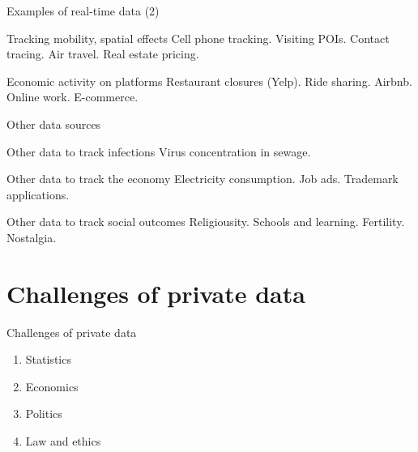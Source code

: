 \documentclass[
  ignorenonframetext,
  aspectratio=54,
]{beamer}
\providecommand{\tightlist}{%
  \setlength{\itemsep}{0pt}\setlength{\parskip}{0pt}}
\begin{document}
\begin{frame}{Examples of real-time data (2)}
\protect\hypertarget{examples-of-real-time-data-2}{}
\begin{block}{Tracking mobility, spatial effects}
\protect\hypertarget{tracking-mobility-spatial-effects}{}
Cell phone tracking. Visiting POIs. Contact tracing. Air travel. Real
estate pricing.
\end{block}

\begin{block}{Economic activity on platforms}
\protect\hypertarget{economic-activity-on-platforms}{}
Restaurant closures (Yelp). Ride sharing. Airbnb. Online work.
E-commerce.
\end{block}
\end{frame}

\begin{frame}{Other data sources}
\protect\hypertarget{other-data-sources}{}
\begin{block}{Other data to track infections}
\protect\hypertarget{other-data-to-track-infections}{}
Virus concentration in sewage.
\end{block}

\begin{block}{Other data to track the economy}
\protect\hypertarget{other-data-to-track-the-economy}{}
Electricity consumption. Job ads. Trademark applications.
\end{block}

\begin{block}{Other data to track social outcomes}
\protect\hypertarget{other-data-to-track-social-outcomes}{}
Religiousity. Schools and learning. Fertility. Nostalgia.
\end{block}
\end{frame}

\hypertarget{challenges-of-private-data}{%
\section{Challenges of private data}\label{challenges-of-private-data}}

\begin{frame}{Challenges of private data}
\protect\hypertarget{challenges-of-private-data-1}{}
\begin{enumerate}
\tightlist
\item
  Statistics
\item
  Economics
\item
  Politics
\item
  Law and ethics
\end{enumerate}
\end{frame}
\end{document}
